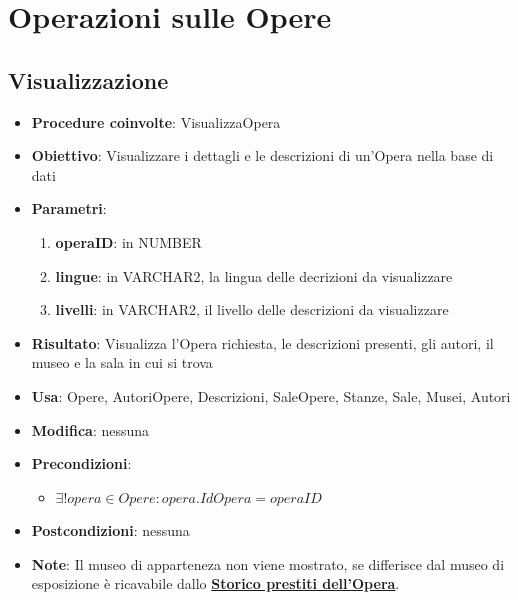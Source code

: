 \section{Operazioni sulle Opere}

\subsection{Visualizzazione}
\begin{itemize}
	\item \textbf{Procedure coinvolte}: VisualizzaOpera
	\item \textbf{Obiettivo}: Visualizzare i dettagli e le descrizioni di un'Opera nella base di dati
	\item \textbf{Parametri}:
	\begin{enumerate}
		\item \textbf{operaID}: in NUMBER
		\item \textbf{lingue}: in VARCHAR2, la lingua delle decrizioni da visualizzare
		\item \textbf{livelli}: in VARCHAR2, il livello delle descrizioni da visualizzare
	\end{enumerate}
	\item \textbf{Risultato}: Visualizza l'Opera richiesta, le descrizioni presenti, gli autori, il museo e la sala in cui si trova
	\item \textbf{Usa}: Opere, AutoriOpere, Descrizioni, SaleOpere, Stanze, Sale, Musei, Autori
	\item \textbf{Modifica}: nessuna
	\item \textbf{Precondizioni}:
	\begin{itemize}
		\item $\exists! opera \in Opere : opera.IdOpera = operaID$
	\end{itemize}
	\item \textbf{Postcondizioni}: nessuna
	\item \textbf{Note}:
	Il museo di apparteneza non viene mostrato, se differisce dal museo di esposizione è ricavabile dallo \hyperref[Storico prestiti dell'Opera]{\textbf{Storico prestiti dell'Opera}}.
\end{itemize}

